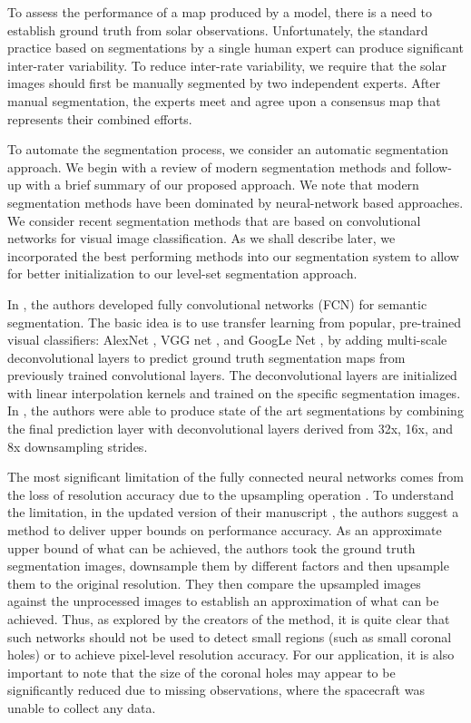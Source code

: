 \documentclass[journal]{IEEEtran}
\begin{document}
To assess the performance of a map produced by a model, there is a need
to establish ground truth from solar observations. 
Unfortunately, the standard practice based on segmentations by a single
     human expert can produce significant inter-rater variability.
To reduce inter-rate variability, we require that the solar images
      should first be manually segmented by two independent experts.
After manual segmentation, the experts meet and agree upon
      a consensus map that represents their combined efforts.


\color{blue}
To automate the segmentation process,
   we consider an automatic segmentation approach.
We begin with a review of modern segmentation methods
   and follow-up with a brief summary
   of our proposed approach.
We note that modern
   segmentation methods have been dominated by 
   neural-network based approaches.   
We consider recent segmentation methods
   that are based on convolutional networks
   for visual image classification.
As we shall describe later, 
   we incorporated the best performing methods
   into our segmentation system
   to allow for better initialization
   to our level-set segmentation approach.    
   
In \cite{long2015fully,shelhamer2016fully}, 
the authors developed fully convolutional
networks (FCN) for semantic segmentation.
The basic idea is to use transfer learning from
popular, pre-trained visual classifiers:
AlexNet \cite{AlexNet}, VGG net \cite{VGGNet}, and GoogLe Net \cite{GoogleNet},
by adding multi-scale
deconvolutional layers to
predict ground truth segmentation maps from 
previously trained convolutional layers.
The deconvolutional layers are initialized
with linear interpolation kernels
and trained on the specific segmentation
images.
In \cite{long2015fully,shelhamer2016fully}, 
the authors were able to produce state of the
art segmentations by combining the final prediction
layer with 
deconvolutional layers derived from
32x, 16x, and 8x  downsampling strides.   

The most significant limitation of the fully connected 
neural networks comes from the loss of resolution
accuracy due to the upsampling operation
\cite{shelhamer2016fully}.
To understand the limitation, in the updated
version of their manuscript
\cite{shelhamer2016fully},
the authors suggest a method to deliver
upper bounds on performance accuracy.
As an approximate upper bound of what can be achieved,
the authors took the ground truth segmentation
images, downsample them by different factors
and then upsample them to the original
resolution.
They then compare the upsampled images
against the unprocessed images to establish
an approximation of what can be achieved.
Thus, as explored by the creators of the method,
it is quite clear that such networks should not
be used to detect small regions (such as small
coronal holes) or to achieve pixel-level
resolution accuracy.
For our application, it is also important
to note that the size of the coronal holes
may appear to be significantly reduced
due to missing observations, where the spacecraft
was unable to collect any data.  
\end{document}
